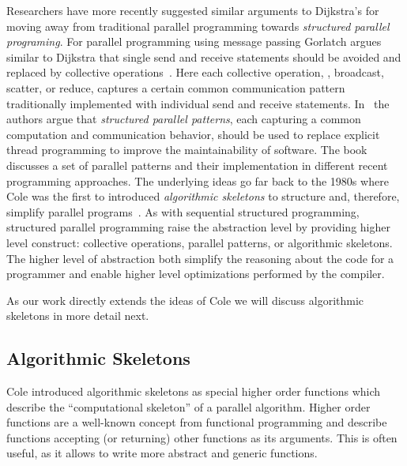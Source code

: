 Researchers have more recently suggested similar arguments to Dijkstra's for moving away from traditional parallel programming towards \emph{structured parallel programing}.
For parallel programming using message passing Gorlatch argues similar to Dijkstra that single send and receive statements should be avoided and replaced by collective operations~\cite{}.
Here each collective operation, \eg, broadcast, scatter, or reduce, captures a certain common communication pattern traditionally implemented with individual send and receive statements.
In~\cite{} the authors argue that \emph{structured parallel patterns}, each capturing a common computation and communication behavior, should be used to replace explicit thread programming to improve the maintainability of software.
The book discusses a set of parallel patterns and their implementation in different recent programming approaches.
The underlying ideas go far back to the 1980s where Cole was the first to introduced \emph{algorithmic skeletons} to structure and, therefore, simplify parallel programs~\cite{Cole1991}.
As with sequential structured programming, structured parallel programming raise the abstraction level by providing higher level construct: collective operations, parallel patterns, or algorithmic skeletons.
The higher level of abstraction both simplify the reasoning about the code for a programmer and enable higher level optimizations performed by the compiler.

As our work directly extends the ideas of Cole we will discuss algorithmic skeletons in more detail next.

\subsection{Algorithmic Skeletons}
Cole introduced algorithmic skeletons as special higher order functions which describe the ``computational skeleton'' of a parallel algorithm.
Higher order functions are a well-known concept from functional programming and describe functions accepting (or returning) other functions as its arguments.
This is often useful, as it allows to write more abstract and generic functions.


